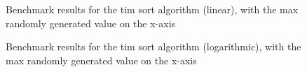 \begin{multicols}{2}

\begin{figure}[H]
  \centering
  
  \caption{Benchmark results for the tim sort algorithm (linear), with the max randomly generated value on the x-axis}
\end{figure}

\begin{figure}[H]
  \centering
  
  \caption{Benchmark results for the tim sort algorithm (logarithmic), with the max randomly generated value on the x-axis}
\end{figure}

\end{multicols}